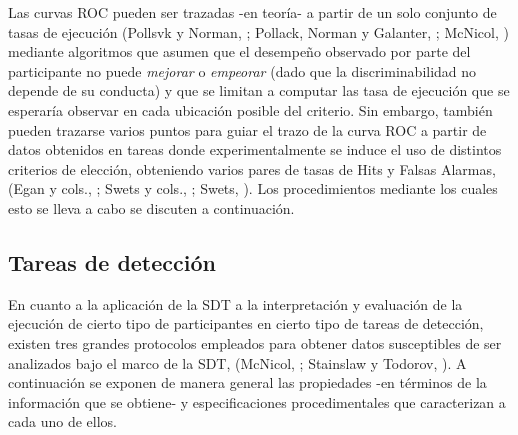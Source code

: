 Las curvas ROC pueden ser trazadas -en teoría- a partir de un solo conjunto de tasas de ejecución (Pollsvk y Norman, \citeyear{Pollack1964a}; Pollack, Norman y Galanter, \citeyear{Pollack1964b}; McNicol, \citeyear{McNicol2}) mediante algoritmos que asumen que el desempeño observado por parte del participante no puede \textit{mejorar} o \textit{empeorar} (dado que la discriminabilidad no depende de su conducta) y que se limitan a computar las tasa de ejecución que se esperaría observar en cada ubicación posible del criterio. Sin embargo, también pueden trazarse varios puntos para guiar el trazo de la curva ROC a partir de datos obtenidos en tareas donde experimentalmente se induce el uso de distintos criterios de elección, obteniendo varios pares de tasas de Hits y Falsas Alarmas, (Egan y cols., \citeyear{Egan1959}; Swets y cols., \citeyear{Swets1961}; Swets, \citeyear{Swets1986}). Los procedimientos mediante los cuales esto se lleva a cabo se discuten a continuación.\\


\subsection{Tareas de detección}

En cuanto a la aplicación de la SDT a la interpretación y evaluación de la ejecución de cierto tipo de participantes en cierto tipo de tareas de detección, existen tres grandes protocolos empleados para obtener datos susceptibles de ser analizados bajo el marco de la SDT, (McNicol, \citeyear{McNicol2}; Stainslaw y Todorov, \citeyear{Stainslaw1999}). A continuación se exponen de manera general las propiedades -en términos de la información que se obtiene- y especificaciones procedimentales que caracterizan a cada uno de ellos.\\

